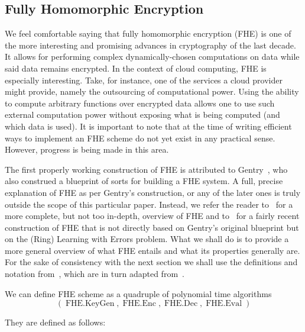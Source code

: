 \documentclass[11pt, a4paper]{article}
\newcommand{\op}[1]{\operatorname{#1}}
\begin{document}


\subsection{Fully Homomorphic Encryption}

We feel comfortable saying that fully homomorphic encryption (FHE) is one of the more interesting and promising advances in cryptography of the last decade.
It allows for performing complex dynamically-chosen computations on data while said data remains encrypted.
In the context of cloud computing, FHE is especially interesting.
Take, for instance, one of the services a cloud provider might provide, namely the outsourcing of computational power.
Using the ability to compute arbitrary functions over encrypted data allows one to use such external computation power without exposing what is being computed (and which data is used).
It is important to note that at the time of writing efficient ways to implement an FHE scheme do not yet exist in any practical sense.
However, progress is being made in this area.

The first properly working construction of FHE is attributed to Gentry~\cite{gentry2009fully}, who also construed a blueprint of sorts for building a FHE system.
A full, precise explanation of FHE as per Gentry's construction, or any of the later ones is truly outside the scope of this particular paper.
Instead, we refer the reader to~\cite{vaikuntanathan2011computing} for a more complete, but not too in-depth, overview of FHE and to~\cite{brakerski2012leveled} for a fairly recent construction of FHE that is not directly based on Gentry's original blueprint but on the (Ring) Learning with Errors problem.
What we shall do is to provide a more general overview of what FHE entails and what its properties generally are.
For the sake of consistency with the next section we shall use the definitions and notation from~\cite{goldwasser2013reusable}, which are in turn adapted from~\cite{vaikuntanathan2011computing}.

We can define FHE scheme as a quadruple of polynomial time algorithms
\[
    (\op{FHE.KeyGen}, \op{FHE.Enc}, \op{FHE.Dec}, \op{FHE.Eval})
\]

They are defined as follows:
\end{document}
